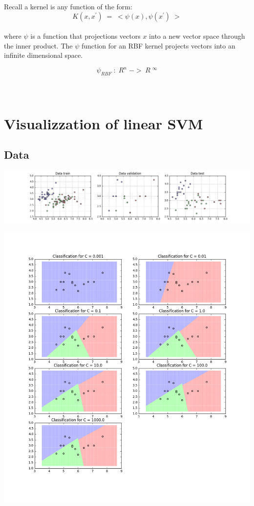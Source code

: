 \documentclass[11pt]{article}
\theoremstyle{plain}
\begin{document}
Recall a kernel is any function of the form:
$$K\left( x,x^{'} \right)\; =\; <\psi \left( x \right),\psi \left( x^{'} \right)\; > $$
\\
where $\psi$ is a function that projections vectors $x$ into a new vector space through the inner product. The $\psi$  function for an RBF kernel projects vectors into an infinite dimensional space. 

$$\psi _{RBF}\; :\; R^{n}\; ->\; R\; ^{\infty }$$
\\
\\
\section{Visualizzation of linear SVM}
\subsection*{Data}

\begin{center}
\includegraphics[scale=0.4]{data}
\end{center}

\begin{center}
\includegraphics[scale=0.45]{0}
\end{center}
\end{document}
